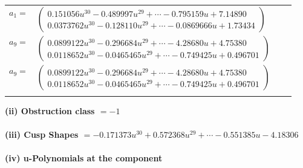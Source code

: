 \documentclass[1p]{elsarticle_modified}
\theoremstyle{definition}
\begin{document}
\begin{tabular}{m{7pt} m{180pt} m{7pt} m{180pt} }
\flushright $a_{1}=$&$\begin{pmatrix}0.151056 u^{30}-0.489997 u^{29}+\cdots-0.795159 u+7.14890\\0.0373762 u^{30}-0.128110 u^{29}+\cdots-0.0869666 u+1.73434\end{pmatrix}$ \\
\flushright $a_{9}=$&$\begin{pmatrix}0.0899122 u^{30}-0.296684 u^{29}+\cdots-4.28680 u+4.75380\\0.0118652 u^{30}-0.0465465 u^{29}+\cdots-0.749425 u+0.496701\end{pmatrix}$\\ \flushright $a_{9}=$&$\begin{pmatrix}0.0899122 u^{30}-0.296684 u^{29}+\cdots-4.28680 u+4.75380\\0.0118652 u^{30}-0.0465465 u^{29}+\cdots-0.749425 u+0.496701\end{pmatrix}$\\&\end{tabular}
\flushleft \textbf{(ii) Obstruction class $= -1$}\\~\\
\flushleft \textbf{(iii) Cusp Shapes $= -0.171373 u^{30}+0.572368 u^{29}+\cdots-0.551385 u-4.18306$}\\~\\
\newpage\renewcommand{\arraystretch}{1}
\flushleft \textbf{(iv) u-Polynomials at the component}\newline \\
\end{document}
